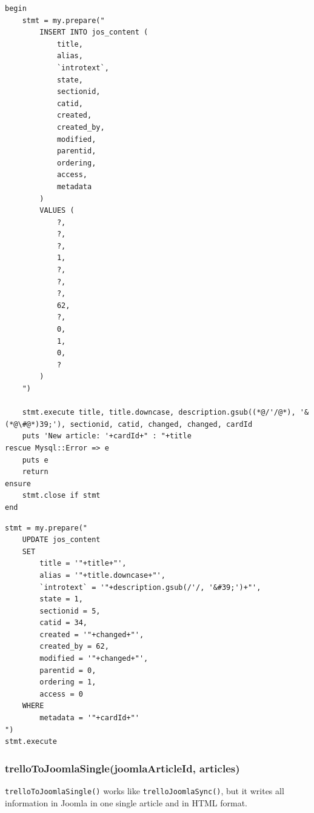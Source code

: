 \begin{lstlisting}[aboveskip=1\baselineskip, caption=Insert new article in the Joomla database., label=listing034]
begin
	stmt = my.prepare("
		INSERT INTO jos_content (
			title, 
			alias, 
			`introtext`, 
			state, 
			sectionid, 
			catid, 
			created, 
			created_by, 
			modified,
			parentid, 
			ordering, 
			access,					
			metadata
		)
		VALUES (
			?, 
			?, 
			?, 
			1, 
			?, 
			?, 
			?, 
			62, 
			?,
			0, 
			1, 
			0,
			?
		)
	")
	
	stmt.execute title, title.downcase, description.gsub((*@/'/@*), '&(*@\#@*)39;'), sectionid, catid, changed, changed, cardId
	puts 'New article: '+cardId+" : "+title
rescue Mysql::Error => e
	puts e
	return
ensure
	stmt.close if stmt
end
\end{lstlisting}


\begin{lstlisting}[aboveskip=1\baselineskip, caption=Updating existing Joomla article., label=listing036]
stmt = my.prepare("
	UPDATE jos_content 
	SET
		title = '"+title+"',
		alias = '"+title.downcase+"',
		`introtext` = '"+description.gsub(/'/, '&#39;')+"',
		state = 1,
		sectionid = 5,
		catid = 34,
		created = '"+changed+"',
		created_by = 62,
		modified = '"+changed+"',
		parentid = 0,
		ordering = 1,
		access = 0
	WHERE
		metadata = '"+cardId+"'
")
stmt.execute
\end{lstlisting}

\subsubsection{trelloToJoomlaSingle(joomlaArticleId, articles)}

\lstinline{trelloToJoomlaSingle()} works like \lstinline{trelloJoomlaSync()}, but it writes all information in Joomla in one single article and in HTML format.

